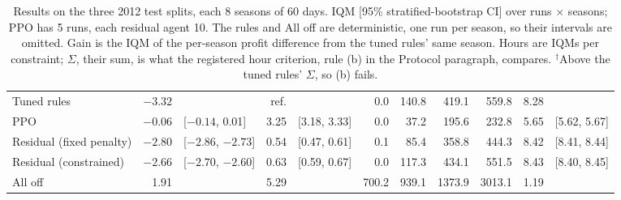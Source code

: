 \documentclass[letterpaper]{article} %
\begin{document}
\begin{table}[t]
\begin{tabular}{lr@{\ }lr@{\ }lrrrrr@{\ }l}
Tuned rules & $-3.32$ &  & ref. &  & 0.0 & 140.8 & 419.1 & 559.8 & 8.28 &  \\
PPO & $-0.06$ & [$-0.14$, 0.01] & 3.25 & [3.18, 3.33] & 0.0 & 37.2 & 195.6 & 232.8 & 5.65 & [5.62, 5.67] \\
Residual (fixed penalty) & $-2.80$ & [$-2.86$, $-2.73$] & 0.54 & [0.47, 0.61] & 0.1 & 85.4 & 358.8 & 444.3 & 8.42 & [8.41, 8.44] \\
Residual (constrained) & $-2.66$ & [$-2.70$, $-2.60$] & 0.63 & [0.59, 0.67] & 0.0 & 117.3 & 434.1 & 551.5 & 8.43 & [8.40, 8.45] \\
All off & 1.91 &  & 5.29 &  & 700.2 & 939.1 & 1373.9 & 3013.1 & 1.19 &  \\
\bottomrule
\end{tabular}
\caption{Results on the three 2012 test splits, each 8 seasons of 60 days. IQM [95\% stratified-bootstrap CI] over runs $\times$ seasons; PPO has 5 runs, each residual agent 10. The rules and All off are deterministic, one run per season, so their intervals are omitted. Gain is the IQM of the per-season profit difference from the tuned rules' same season. Hours are IQMs per constraint; $\Sigma$, their sum, is what the registered hour criterion, rule (b) in the Protocol paragraph, compares. $^\dagger$Above the tuned rules' $\Sigma$, so (b) fails.}
\label{tab:results}
\end{table}
\end{document}
